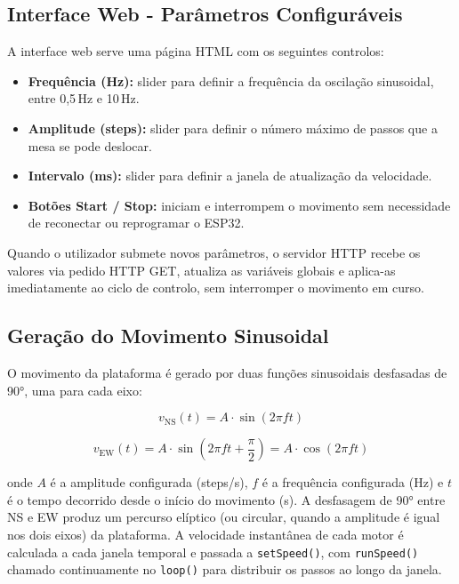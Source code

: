\subsection{Interface Web - Parâmetros Configuráveis}
\label{subsec:interface-web}

A interface web serve uma página HTML com os seguintes controlos:

\begin{itemize}
    \item \textbf{Frequência (Hz):} slider para definir a frequência da oscilação sinusoidal, entre 0,5\,Hz e 10\,Hz.
    \item \textbf{Amplitude (steps):} slider para definir o número máximo de passos que a mesa se pode deslocar.
    \item \textbf{Intervalo (ms):} slider para definir a janela de atualização da velocidade.
    \item \textbf{Botões Start / Stop:} iniciam e interrompem o movimento sem necessidade de reconectar ou reprogramar o ESP32.
\end{itemize}

Quando o utilizador submete novos parâmetros, o servidor HTTP recebe os valores via pedido HTTP GET, atualiza as variáveis globais e aplica-as imediatamente ao ciclo de controlo, sem interromper o movimento em curso.


\subsection{Geração do Movimento Sinusoidal}
\label{subsec:movimento-sinusoidal}

O movimento da plataforma é gerado por duas funções sinusoidais desfasadas de 90°, uma para cada eixo:

\begin{equation}
v_{\text{NS}}(t) = A \cdot \sin(2\pi f t)
\label{eq:vel-ns}
\end{equation}

\begin{equation}
v_{\text{EW}}(t) = A \cdot \sin\!\left(2\pi f t + \frac{\pi}{2}\right) = A \cdot \cos(2\pi f t)
\label{eq:vel-ew}
\end{equation}

onde $A$ é a amplitude configurada (steps/s), $f$ é a frequência configurada (Hz) e $t$ é o tempo decorrido desde o início do movimento (s). A desfasagem de 90° entre NS e EW produz um percurso elíptico (ou circular, quando a amplitude é igual nos dois eixos) da plataforma. A velocidade instantânea de cada motor é calculada a cada janela temporal e passada a \texttt{setSpeed()}, com \texttt{runSpeed()}~\cite{AccelStepper} chamado continuamente no \texttt{loop()} para distribuir os passos ao longo da janela.

